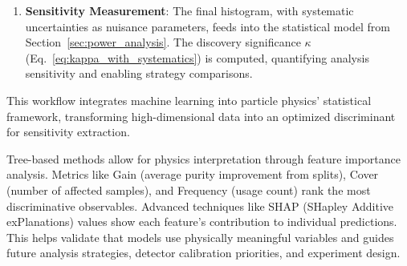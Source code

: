 \begin{enumerate}
    \item \textbf{Sensitivity Measurement}: The final histogram, with systematic uncertainties as nuisance parameters, feeds into the statistical model from Section~\ref{sec:power_analysis}. The discovery significance $\kappa$ (Eq.~\ref{eq:kappa_with_systematics}) is computed, quantifying analysis sensitivity and enabling strategy comparisons.
\end{enumerate}

This workflow integrates machine learning into particle physics' statistical framework, transforming high-dimensional data into an optimized discriminant for sensitivity extraction.


Tree-based methods allow for physics interpretation through feature importance analysis. Metrics like Gain (average purity improvement from splits), Cover (number of affected samples), and Frequency (usage count) rank the most discriminative observables. Advanced techniques like SHAP (SHapley Additive exPlanations) values show each feature's contribution to individual predictions. This helps validate that models use physically meaningful variables and guides future analysis strategies, detector calibration priorities, and experiment design.
